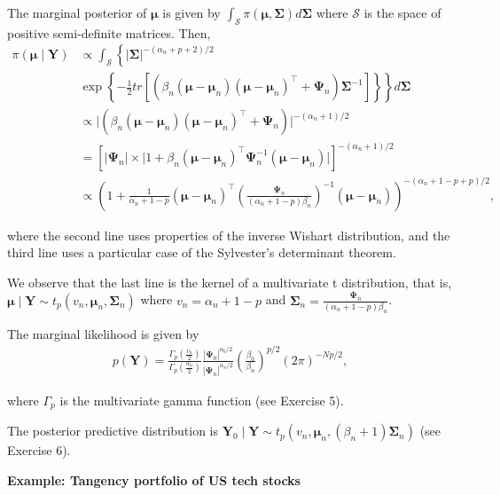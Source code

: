 \begin{enumerate}
The marginal posterior of $\bm{\mu}$ is given by $\int_{\mathcal{S}} \pi(\bm{\mu},\bm{\Sigma})d\bm{\Sigma}$ where $\mathcal{S}$ is the space of positive semi-definite matrices. Then,
{\footnotesize{
\begin{align}
	\pi(\bm{\mu}\mid \bm{Y})&\propto\int_{\mathcal{S}}\left\{|\bm{\Sigma}|^{-(\alpha_n+p+2)/2}\right.\nonumber\\
	&\left. \exp\left\{-\frac{1}{2}tr\left[\left(\beta_n\left(\bm{\mu}-\bm{\mu}_n\right)\left(\bm{\mu}-\bm{\mu}_n\right)^{\top}+\bm{\Psi}_n\right)\bm{\Sigma}^{-1}\right]\right\} \right\}d\bm{\Sigma}\nonumber\\
	&\propto \big\lvert\left(\beta_n\left(\bm{\mu}-\bm{\mu}_n\right)\left(\bm{\mu}-\bm{\mu}_n\right)^{\top}+\bm{\Psi}_n\right)\big\lvert^{-(\alpha_n+1)/2}\nonumber\\
	&=\left[\big\lvert\bm{\Psi}_n\big\lvert\times \big\lvert1+\beta_n\left(\bm{\mu}-\bm{\mu}_n\right)^{\top}\bm{\Psi}_n^{-1}\left(\bm{\mu}-\bm{\mu}_n\right)\big\lvert\right]^{-(\alpha_n+1)/2}\nonumber\\
	&\propto \left(1+\frac{1}{\alpha_n+1-p}\left(\bm{\mu}-\bm{\mu}_n\right)^{\top}\left(\frac{\bm{\Psi}_n}{(\alpha_n+1-p)\beta_n}\right)^{-1}\left(\bm{\mu}-\bm{\mu}_n\right)\right)^{-(\alpha_n+1-p+p)/2},\nonumber 
\end{align}
}}

where the second line uses properties of the inverse Wishart distribution, and the third line uses a particular case of the Sylvester's determinant theorem.

We observe that the last line is the kernel of a multivariate t distribution, that is, $\bm{\mu}\mid \bm{Y}\sim t_p(v_n,\bm{\mu}_n,\bm{\Sigma}_n)$ where $v_n=\alpha_n+1-p$ and $\bm{\Sigma}_n=\frac{\bm{\Psi}_n}{(\alpha_n+1-p)\beta_n}$.

The marginal likelihood is given by
\begin{align}
	p(\bm{Y})=\frac{\Gamma_p\left(\frac{v_n}{2}\right)}{\Gamma_p\left(\frac{\alpha_0}{2}\right)}\frac{|\bm{\Psi}_0|^{\alpha_0/2}}{|\bm{\Psi}_n|^{\alpha_n/2}}\left(\frac{\beta_0}{\beta_n}\right)^{p/2}(2\pi)^{-Np/2},\nonumber
\end{align}

where $\Gamma_p$ is the multivariate gamma function (see Exercise 5).

The posterior predictive distribution is $\bm{Y}_0\mid \bm{Y}\sim t_p(v_n,\bm{\mu}_n,(\beta_n+1)\bm{\Sigma}_n)$ (see Exercise 6).

\textbf{Example: Tangency portfolio of US tech stocks}


\end{enumerate}
